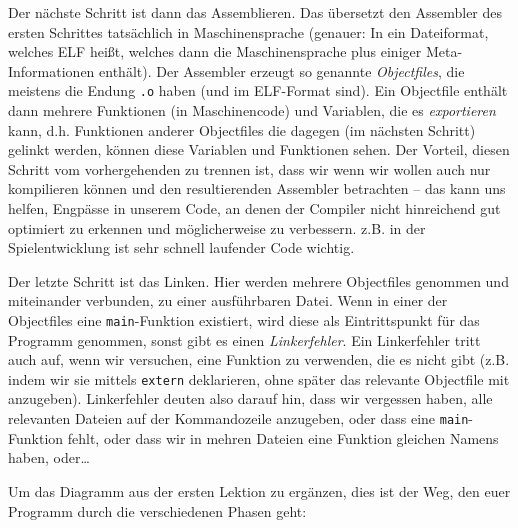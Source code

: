 Der nächste Schritt ist dann das Assemblieren. Das übersetzt den Assembler des
ersten Schrittes tatsächlich in Maschinensprache (genauer: In ein Dateiformat,
welches ELF heißt, welches dann die Maschinensprache plus einiger
Meta-Informationen enthält). Der Assembler erzeugt so genannte
\emph{Objectfiles}, die meistens die Endung \texttt{.o} haben (und im
ELF-Format sind). Ein Objectfile enthält dann mehrere Funktionen (in
Maschinencode) und Variablen, die es \emph{exportieren} kann, d.h. Funktionen
anderer Objectfiles die dagegen (im nächsten Schritt) gelinkt werden, können
diese Variablen und Funktionen sehen. Der Vorteil, diesen Schritt vom
vorhergehenden zu trennen ist, dass wir wenn wir wollen auch nur kompilieren
können und den resultierenden Assembler betrachten -- das kann uns helfen,
Engpässe in unserem Code, an denen der Compiler nicht hinreichend gut optimiert
zu erkennen und möglicherweise zu verbessern. z.B. in der Spielentwicklung ist
sehr schnell laufender Code wichtig.

Der letzte Schritt ist das Linken. Hier werden mehrere Objectfiles genommen und
miteinander verbunden, zu einer ausführbaren Datei. Wenn in einer der
Objectfiles eine \texttt{main}-Funktion existiert, wird diese als
Eintrittspunkt für das Programm genommen, sonst gibt es einen
\emph{Linkerfehler}. Ein Linkerfehler tritt auch auf, wenn wir versuchen, eine
Funktion zu verwenden, die es nicht gibt (z.B. indem wir sie mittels
\texttt{extern} deklarieren, ohne später das relevante Objectfile mit
anzugeben). Linkerfehler deuten also darauf hin, dass wir vergessen haben, alle
relevanten Dateien auf der Kommandozeile anzugeben, oder dass eine
\texttt{main}-Funktion fehlt, oder dass wir in mehren Dateien eine Funktion
gleichen Namens haben, oder\dots

Um das Diagramm aus der ersten Lektion zu ergänzen, dies ist der Weg, den euer
Programm durch die verschiedenen Phasen geht:


